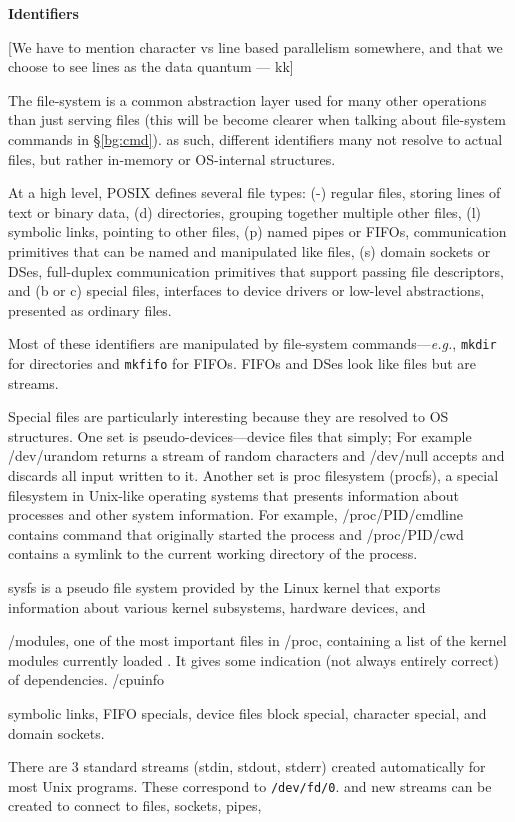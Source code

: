 \documentclass[sigplan,10pt,review,anonymous]{acmart}
\newcommand{\eg}{{\em e.g.}, }
\newcommand{\heading}[1]{\vspace{4pt}\noindent\textbf{#1}\enspace}
\newcommand{\ttt}[1]{\texttt{\small #1}}
\newcommand{\kk}[1]{[{\color{magenta}#1 --- kk}]}
\begin{document}
\heading{Identifiers}

\kk{We have to mention character vs line based parallelism somewhere,
  and that we choose to see lines as the data quantum}

The file-system is a common abstraction layer used for many other operations than just serving files (this will be become clearer when talking about file-system commands in \S\ref{bg:cmd}).
as such, different identifiers many not resolve to actual files, but rather in-memory or OS-internal structures.

At a high level, POSIX defines several file types:
(-) regular files, storing lines of text or binary data,
(d) directories, grouping together multiple other files,
(l) symbolic links, pointing to other files,
(p) named pipes or FIFOs, communication primitives that can be named and manipulated like files,
(s) domain sockets or DSes, full-duplex communication primitives that support passing file descriptors, and
(b or c) special files, interfaces to device drivers or low-level abstractions, presented as ordinary files.

Most of these identifiers are manipulated by file-system commands---\eg \ttt{mkdir} for directories and \ttt{mkfifo} for FIFOs.
FIFOs and DSes look like files but are streams.

Special files are particularly interesting because they are resolved to OS structures.
One set is pseudo-devices---device files that simply;
For example /dev/urandom returns a stream of random characters and /dev/null accepts and discards all input written to it.
Another set is proc filesystem (procfs), a special filesystem in Unix-like operating systems that presents information about processes and other system information.
For example, /proc/PID/cmdline contains command that originally started the process and /proc/PID/cwd contains a symlink to the current working directory of the process.

sysfs is a pseudo file system provided by the Linux kernel that exports information about various kernel subsystems, hardware devices, and 

/modules, one of the most important files in /proc, containing a list of the kernel modules currently loaded . It gives some indication (not always entirely correct) of dependencies.
/cpuinfo

symbolic links, FIFO specials, 
device files
block special, character special, 
and domain sockets.

There are 3 standard streams (stdin, stdout, stderr) created automatically for most Unix programs.
These correspond to \ttt{/dev/fd/0}.
and new streams can be created to connect to files, sockets, pipes,
\end{document}
